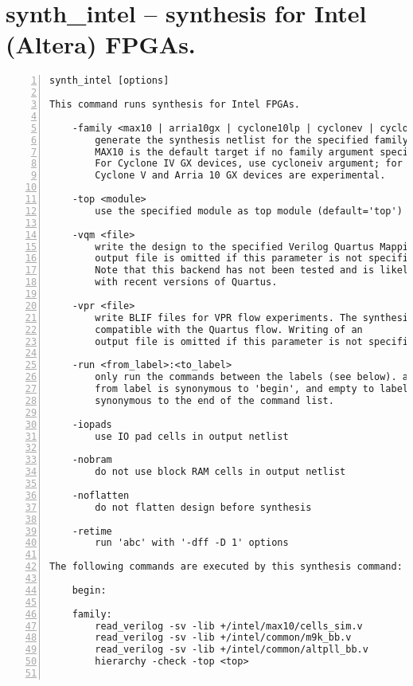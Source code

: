 \section{synth\_intel -- synthesis for Intel (Altera) FPGAs.}
\label{cmd:synth_intel}
\begin{lstlisting}[numbers=left,frame=single]
    synth_intel [options]

This command runs synthesis for Intel FPGAs.

    -family <max10 | arria10gx | cyclone10lp | cyclonev | cycloneiv | cycloneive>
        generate the synthesis netlist for the specified family.
        MAX10 is the default target if no family argument specified.
        For Cyclone IV GX devices, use cycloneiv argument; for Cyclone IV E, use cycloneive.
        Cyclone V and Arria 10 GX devices are experimental.

    -top <module>
        use the specified module as top module (default='top')

    -vqm <file>
        write the design to the specified Verilog Quartus Mapping File. Writing of an
        output file is omitted if this parameter is not specified.
        Note that this backend has not been tested and is likely incompatible
        with recent versions of Quartus.

    -vpr <file>
        write BLIF files for VPR flow experiments. The synthesized BLIF output file is not
        compatible with the Quartus flow. Writing of an
        output file is omitted if this parameter is not specified.

    -run <from_label>:<to_label>
        only run the commands between the labels (see below). an empty
        from label is synonymous to 'begin', and empty to label is
        synonymous to the end of the command list.

    -iopads
        use IO pad cells in output netlist

    -nobram
        do not use block RAM cells in output netlist

    -noflatten
        do not flatten design before synthesis

    -retime
        run 'abc' with '-dff -D 1' options

The following commands are executed by this synthesis command:

    begin:

    family:
        read_verilog -sv -lib +/intel/max10/cells_sim.v
        read_verilog -sv -lib +/intel/common/m9k_bb.v
        read_verilog -sv -lib +/intel/common/altpll_bb.v
        hierarchy -check -top <top>


\end{lstlisting}

